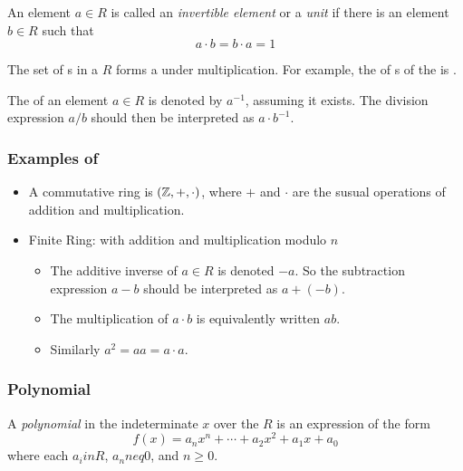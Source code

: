 \begin{definition}\label{def:Invertible_Element}
  An element $a \in R$ is called an \emph{invertible element} or a \emph{unit} if there is an element $b \in R$ such that
  \begin{equation}\label{eq:Invertible_Element}
    a \cdot b = b \cdot a = 1
  \end{equation}

  \begin{remark}
    The set of s in a  $R$ forms a  under multiplication.
    For example, the  of s of the  \TextIntsModN{} is \TextMultiplicativeGroupN{}.
  \end{remark}
  
  \begin{remark}\label{rmk:Ring_Multiplicative_Inverse}
    The  of an element $a \in R$ is denoted by $a^{-1}$, assuming it exists.
    The division expression $a/b$ should then be interpreted as $a \cdot b^{-1}$.
  \end{remark}
\end{definition}

\subsubsection{Examples of }\label{subsubsec:Examples_of_Rings}
\begin{itemize}[noitemsep]
\item A commutative ring is $(\operatorname{\mathbb{Z}}, +, \cdot)$, where $+$ and $\cdot$ are the susual operations of addition and multiplication.
\item Finite Ring: \TextIntsModN{} with addition and multiplication modulo $n$
  \begin{itemize}[noitemsep]
  \item The additive inverse of $a \in R$ is denoted $-a$. So the subtraction expression $a-b$ should be interpreted as $a + (-b)$.
  \item The multiplication of $a \cdot b$ is equivalently written $ab$.
  \item Similarly $a^{2} = aa = a \cdot a$.
  \end{itemize}
\end{itemize}

\subsubsection{Polynomial }\label{subsubsec:Polynomial_Rings}
\begin{definition}[Polynomial]\label{def:Polynomial}
  A \emph{polynomial} in the indeterminate $x$ over the  $R$ is an expression of the form
  \begin{equation}\label{eq:Polynomial_Ring}
    f(x) = a_{n}x^{n} + \cdots + a_{2}x^{2} + a_{1}x + a_{0}
  \end{equation}
  where each $a_{i} in R$, $a_{n} neq 0$, and $n \geq 0$.
\end{definition}

